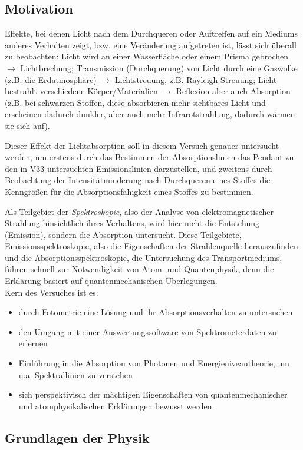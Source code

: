 \subsection{Motivation}
Effekte, bei denen Licht nach dem Durchqueren oder Auftreffen auf ein Mediums anderes Verhalten zeigt, bzw. eine Veränderung aufgetreten ist, lässt sich überall zu beobachten: Licht wird an einer Wasserfläche oder einem Prisma gebrochen \(\rightarrow\) Lichtbrechung; Transmission (Durchquerung) von Licht durch eine Gaswolke (z.B. die Erdatmosphäre) \(\rightarrow\) Lichtstreuung, z.B. Rayleigh-Streuung; Licht bestrahlt verschiedene Körper/Materialien \(\rightarrow\) Reflexion aber auch Absorption (z.B. bei schwarzen Stoffen, diese absorbieren mehr sichtbares Licht und erscheinen dadurch dunkler, aber auch mehr Infrarotstrahlung, dadurch wärmen sie sich auf).

Dieser Effekt der Lichtabsorption soll in diesem Versuch genauer untersucht werden, um erstens durch das Bestimmen der Absorptionslinien das Pendant zu den in V33 untersuchten Emissionslinien darzustellen, und zweitens durch Beobachtung der Intensitätminderung nach Durchqueren eines Stoffes die Kenngrößen für die Absorptionsfähigkeit eines Stoffes zu bestimmen.

Als Teilgebiet der \emph{Spektroskopie}, also der Analyse von elektromagnetischer Strahlung hinsichtlich ihres Verhaltens, wird hier nicht die Entstehung (Emission), sondern die Absorption untersucht. Diese Teilgebiete, Emissionsspektroskopie, also die Eigenschaften der Strahlenquelle herauszufinden und die Absorptionsspektroskopie, die Untersuchung des Transportmediums, führen schnell zur Notwendigkeit von Atom- und Quantenphysik, denn die Erklärung basiert auf quantenmechanischen Überlegungen.\\
Kern des Versuches ist es:
\begin{itemize}
    \item durch Fotometrie eine Lösung und ihr Absorptionsverhalten zu untersuchen
    \item den Umgang mit einer Auswertungssoftware von Spektrometerdaten zu erlernen
    \item Einführung in die Absorption von Photonen und Energieniveautheorie, um u.a. Spektrallinien zu verstehen
    \item sich perspektivisch der mächtigen Eigenschaften von quantenmechanischer und atomphysikalischen Erklärungen bewusst werden.
\end{itemize}

\subsection[Theoretische Grundlagen der Physik]{Grundlagen der Physik \autocite{Skript_1}}
